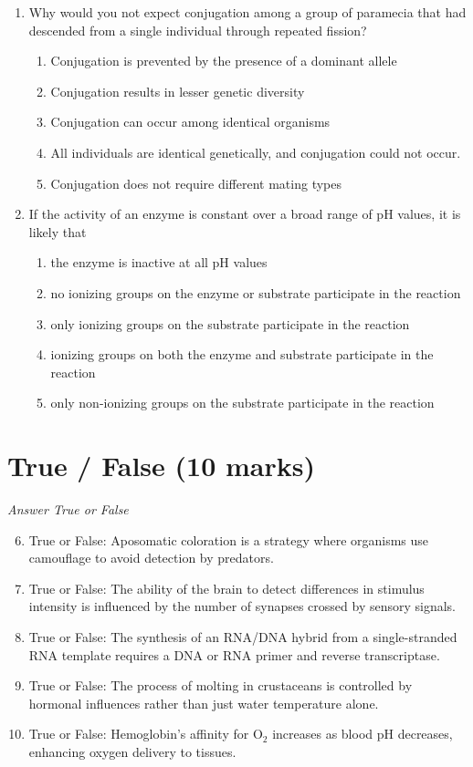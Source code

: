 \documentclass[12pt]{article}
\begin{document}
\begin{enumerate}[label=\arabic*.]
\item Why would you not expect conjugation among a group of paramecia that had descended from a single individual through repeated fission?
\begin{enumerate}[label=(\alph*)]
    \item Conjugation is prevented by the presence of a dominant allele
    \item Conjugation results in lesser genetic diversity
    \item Conjugation can occur among identical organisms
    \item All individuals are identical genetically, and conjugation could not occur.
    \item Conjugation does not require different mating types
\end{enumerate}
\item If the activity of an enzyme is constant over a broad range of pH values, it is likely that
\begin{enumerate}[label=(\alph*)]
    \item the enzyme is inactive at all pH values
    \item no ionizing groups on the enzyme or substrate participate in the reaction
    \item only ionizing groups on the substrate participate in the reaction
    \item ionizing groups on both the enzyme and substrate participate in the reaction
    \item only non-ionizing groups on the substrate participate in the reaction
\end{enumerate}
\end{enumerate}

\section*{True / False (10 marks)}
\textit{Answer True or False}
\begin{enumerate}[label=\arabic*.]
\setcounter{enumi}{5}
\item True or False: Aposomatic coloration is a strategy where organisms use camouflage to avoid detection by predators.
\item True or False: The ability of the brain to detect differences in stimulus intensity is influenced by the number of synapses crossed by sensory signals.
\item True or False: The synthesis of an RNA/DNA hybrid from a single-stranded RNA template requires a DNA or RNA primer and reverse transcriptase.
\item True or False: The process of molting in crustaceans is controlled by hormonal influences rather than just water temperature alone.
\item True or False: Hemoglobin's affinity for O$_{2}$ increases as blood pH decreases, enhancing oxygen delivery to tissues.
\end{enumerate}
\end{document}

